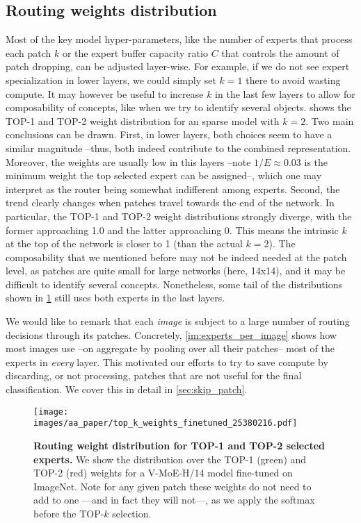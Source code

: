 \documentclass{article}
\newcommand{\abbv}{{V-MoE}}
\begin{document}
\subsection{Routing weights distribution}
\label{app_analysis_routing_weights_distribution}
Most of the key model hyper-parameters, like the number of experts that process each patch $k$ or the expert buffer capacity ratio $C$ that controls the amount of patch dropping, can be adjusted layer-wise.
For example, if we do not see expert specialization in lower layers, we could simply set $k=1$ there to avoid wasting compute.
It may however be useful to increase $k$ in the last few layers to allow for composability of concepts, like when we try to identify several objects.
 shows the TOP-1 and TOP-2 weight distribution for an sparse model with $k=2$.
Two main conclusions can be drawn.
First, in lower layers, both choices seem to have a similar magnitude --thus, both indeed contribute to the combined representation.
Moreover, the weights are usually low in this layers --note $1/E \approx 0.03$ is the minimum weight the top selected expert can be assigned--, which one may interpret as the router being somewhat indifferent among experts.
Second, the trend clearly changes when patches travel towards the end of the network.
In particular, the TOP-1 and TOP-2 weight distributions strongly diverge, with the former approaching 1.0 and the latter approaching 0.
This means the intrinsic $k$ at the top of the network is closer to 1 (than the actual $k=2$).
The composability that we mentioned before may not be indeed needed at the patch level, as patches are quite small for large networks (here, 14x14), and it may be difficult to identify several concepts.
Nonetheless, some tail of the distributions shown in \cref{im:top_k_weight_distribution} still uses both experts in the last layers.

We would like to remark that each \emph{image} is subject to a large number of routing decisions through its patches.
Concretely, \cref{im:experts_per_image} shows how most images use --on aggregate by pooling over all their patches-- most of the experts in \emph{every} layer.
This motivated our efforts to try to save compute by discarding, or not processing, patches that are not useful for the final classification.
We cover this in detail in \cref{sec:skip_patch}.

\begin{figure}[h]
\centering
\texttt{[image: images/aa\_paper/top\_k\_weights\_finetuned\_25380216.pdf]}
\caption{\textbf{Routing weight distribution for TOP-1 and TOP-2 selected experts.}
We show the distribution over the TOP-1 (green) and TOP-2 (red) weights for a \abbv{}-H/14 model fine-tuned on ImageNet.
Note for any given patch these weights do not need to add to one ---and in fact they will not---, as we apply the softmax before the TOP-$k$ selection.
}
\label{im:top_k_weight_distribution}
\end{figure}
\end{document}
